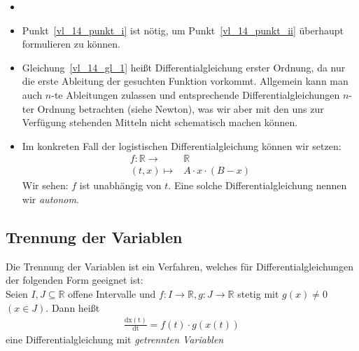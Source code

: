 \begin{Bemerkung}{
	\begin{itemize}
		\item[ ]
		\item Punkt~\ref{vl_14_punkt_i}
		ist nötig, um Punkt~\ref{vl_14_punkt_ii}	überhaupt formulieren zu können.
		\item Gleichung~\ref{vl_14_gl_1} heißt Differentialgleichung erster Ordnung, 
		da nur die erste Ableitung der gesuchten Funktion vorkommt. Allgemein kann 
		man auch $n$-te Ableitungen zulassen und entsprechende
		 Differentialgleichungen $n$-ter Ordnung betrachten (siehe Newton), 
		was wir aber mit den uns zur Verfügung stehenden Mitteln nicht schematisch
		 machen können.
		\item Im konkreten Fall der logistischen Differentialgleichung können 
		wir setzen:
		\begin{align*}
			f : \mathbb{R} \rightarrow & \mathbb{R} \\
			(t,x) \mapsto & A\cdot x \cdot (B-x)
		\end{align*}
		Wir sehen: $f$ ist unabhängig von $t$. Eine solche Differentialgleichung 
		nennen wir \emph{autonom}.
	\end{itemize}
}\end{Bemerkung}

\subsection{Trennung der Variablen}
Die Trennung der Variablen ist ein Verfahren, welches für Differentialgleichungen
 der  folgenden Form geeignet ist: \\
 Seien $I, J \subseteq \mathbb{R}$ offene Intervalle und $f: I \rightarrow \mathbb{R}, g: J \rightarrow \mathbb{R}$ stetig mit $g(x) \neq 0$ $(x \in J)$.
 Dann heißt 
\begin{align}\label{vl_14_gl_2}
 	\frac{\mathrm{dx(t)}}{\mathrm{dt}} = f(t) \cdot g(x(t))
\end{align}  
eine Differentialgleichung mit \emph{getrennten Variablen}

